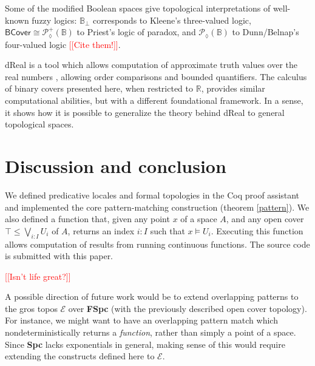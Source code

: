 \documentclass[conference]{IEEEtran}
\newcommand{\PLower}{\mathcal{P}_\lozenge}
\newcommand{\R}{\mathbb{R}}
\newcommand{\bool}{\mathbb{B}}
\newcommand{\note}[1]{\textcolor{red}{[[{#1}]]}}
\begin{document}
Some of the modified Boolean spaces give topological interpretations of well-known fuzzy logics: $\bool_\bot$ corresponds to Kleene's three-valued logic, $\mathsf{BCover} \cong \PLower^+(\bool)$ to Priest's logic of paradox, and $\PLower(\bool)$ to Dunn/Belnap's four-valued logic \note{Cite them!}.

dReal is a tool which allows computation of approximate truth values over the real numbers \cite{dReal}, allowing order comparisons and bounded quantifiers. The calculus of binary covers presented here, when restricted to $\R$, provides similar computational abilities, but with a different foundational framework. In a sense, it shows how it is possible to generalize the theory behind dReal to general topological spaces.

\section{Discussion and conclusion}

We defined predicative locales and formal topologies in the Coq proof assistant and implemented the core pattern-matching construction (theorem \ref{pattern}). We also defined a function that, given any point $x$ of a space $A$, and any open cover $\top \le \bigvee_{i : I} U_i$ of $A$, returns an index $i : I$ such that $x \models U_i$. Executing this function allows computation of results from running continuous functions. The source code is submitted with this paper.

\note{Isn't life great?}

A possible direction of future work would be to extend overlapping patterns to the gros topos $\mathcal{E}$ over \textbf{FSpc} (with the previously described open cover topology). For instance, we might want to have an overlapping pattern match which nondeterministically returns a \emph{function}, rather than simply a point of a space. Since \textbf{Spc} lacks exponentials in general, making sense of this would require extending the constructs defined here to $\mathcal{E}$.




\end{document}
